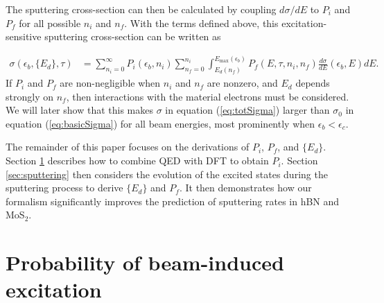 \documentclass{article}
\begin{document}
\noindent
The sputtering cross-section can then be calculated by coupling $d\sigma/dE$ to
$P_i$ and $P_f$ for all possible $n_i$ and $n_f$.
With the terms defined above, this excitation-sensitive sputtering
cross-section can be written as

\begin{equation}
  \begin{aligned}
    \sigma(\epsilon_b, \{{E}_d\}, \tau)
    &=
    \sum_{n_i=0}^\infty
    P_i(\epsilon_b, n_i)
    \sum_{n_f=0}^{n_i}
    \int_{E_d(n_f)}^{E_\text{max}(\epsilon_b)}
    P_f(E, \tau, n_i, n_f)
    \frac{d\sigma}{dE}(\epsilon_b, E)
    dE.
  \end{aligned}
  \label{eq:totSigma}
\end{equation}
%
If $P_i$ and $P_f$ are non-negligible when $n_i$ and $n_f$ are nonzero, and
$E_d$ depends strongly on $n_f$, then interactions with the material electrons
must be considered.
We will later show that this makes $\sigma$ in equation (\ref{eq:totSigma})
larger than $\sigma_0$ in equation (\ref{eq:basicSigma}) for all beam energies,
most prominently when $\epsilon_b < \epsilon_c$.

The remainder of this paper focuses on the derivations of $P_i$, $P_f$, and
$\{E_d\}$.
Section \ref{sec:probability} describes how to combine QED with DFT to obtain
$P_i$.
Section \ref{sec:sputtering} then considers the evolution of the excited states
during the sputtering process to derive $\{E_d\}$ and $P_f$. It then demonstrates
how our formalism significantly improves the prediction of sputtering rates in
hBN and MoS$_2$.

\section{Probability of beam-induced excitation} 
\label{sec:probability}
\end{document}
